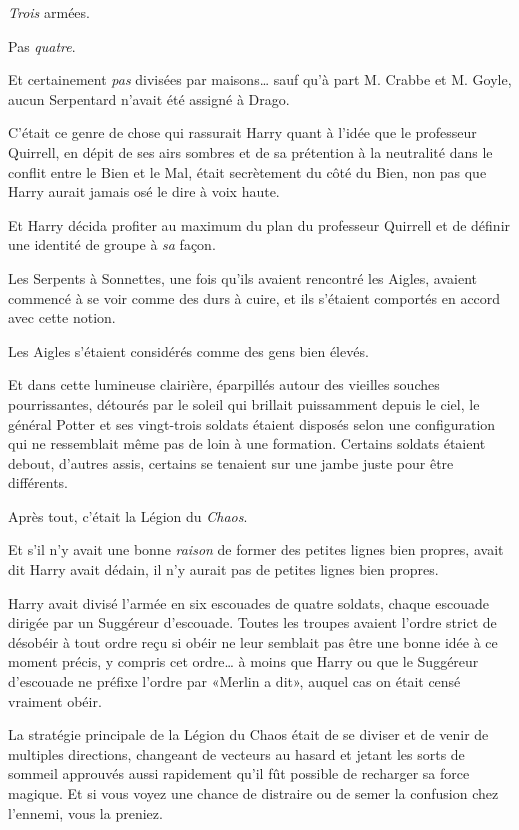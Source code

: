 \emph{Trois} armées.

Pas \emph{quatre}.

Et certainement \emph{pas} divisées par maisons… sauf qu'à part M. Crabbe et M. Goyle, aucun Serpentard n'avait été assigné à Drago.

C'était ce genre de chose qui rassurait Harry quant à l'idée que le professeur Quirrell, en dépit de ses airs sombres et de sa prétention à la neutralité dans le conflit entre le Bien et le Mal, était secrètement du côté du Bien, non pas que Harry aurait jamais osé le dire à voix haute.

Et Harry décida profiter au maximum du plan du professeur Quirrell et de définir une identité de groupe à \emph{sa} façon.

Les Serpents à Sonnettes, une fois qu'ils avaient rencontré les Aigles, avaient commencé à se voir comme des durs à cuire, et ils s'étaient comportés en accord avec cette notion.

Les Aigles s'étaient considérés comme des gens bien élevés.

Et dans cette lumineuse clairière, éparpillés autour des vieilles souches pourrissantes, détourés par le soleil qui brillait puissamment depuis le ciel, le général Potter et ses vingt-trois soldats étaient disposés selon une configuration qui ne ressemblait même pas de loin à une formation. Certains soldats étaient debout, d'autres assis, certains se tenaient sur une jambe juste pour être différents.

Après tout, c'était la Légion du \emph{Chaos}.

Et s'il n'y avait une bonne \emph{raison} de former des petites lignes bien propres, avait dit Harry avait dédain, il n'y aurait pas de petites lignes bien propres.

Harry avait divisé l'armée en six escouades de quatre soldats, chaque escouade dirigée par un Suggéreur d'escouade. Toutes les troupes avaient l'ordre strict de désobéir à tout ordre reçu si obéir ne leur semblait pas être une bonne idée à ce moment précis, y compris cet ordre… à moins que Harry ou que le Suggéreur d'escouade ne préfixe l'ordre par «Merlin a dit», auquel cas on était censé vraiment obéir.

La stratégie principale de la Légion du Chaos était de se diviser et de venir de multiples directions, changeant de vecteurs au hasard et jetant les sorts de sommeil approuvés aussi rapidement qu'il fût possible de recharger sa force magique. Et si vous voyez une chance de distraire ou de semer la confusion chez l'ennemi, vous la preniez.

